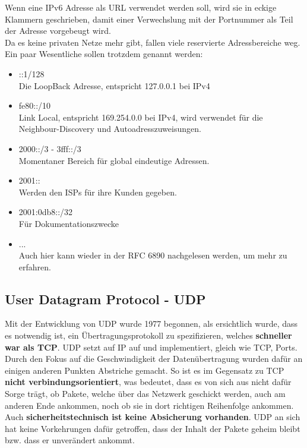 \documentclass[12pt,a4paper]{report}
\begin{document}
Wenn eine IPv6 Adresse als URL verwendet werden soll, wird sie in eckige Klammern geschrieben, damit einer Verwechslung mit der Portnummer als Teil der Adresse vorgebeugt wird.\\

Da es keine privaten Netze mehr gibt, fallen viele reservierte Adressbereiche weg. Ein paar Wesentliche sollen trotzdem genannt werden:
\begin{itemize}
\item ::1/128\\
Die LoopBack Adresse, entspricht 127.0.0.1 bei IPv4
\item fe80::/10\\
Link Local, entspricht 169.254.0.0 bei IPv4, wird verwendet für die Neighbour-Discovery und Autoadresszuweisungen.
\item 2000::/3 - 3fff::/3\\
Momentaner Bereich für global eindeutige Adressen.
\item 2001::\\
Werden den ISPs für ihre Kunden gegeben.
\item 2001:0db8::/32\\
Für Dokumentationszwecke
\item ...\\
Auch hier kann wieder in der RFC 6890 nachgelesen werden, um mehr zu erfahren.
\end{itemize}
\subsection{User Datagram Protocol - UDP}
Mit der Entwicklung von UDP wurde 1977 begonnen, als ersichtlich wurde, dass es notwendig ist, ein Übertragungsprotokoll zu spezifizieren, welches \textbf{schneller war als TCP}. UDP setzt auf IP auf und implementiert, gleich wie TCP, Ports.\\

Durch den Fokus auf die Geschwindigkeit der Datenübertragung wurden dafür an einigen anderen Punkten Abstriche gemacht. So ist es im Gegensatz zu TCP \textbf{nicht verbindungsorientiert}, was bedeutet, dass es von sich aus nicht dafür Sorge trägt, ob Pakete, welche über das Netzwerk geschickt werden, auch am anderen Ende ankommen, noch ob sie in dort richtigen Reihenfolge ankommen.\\
Auch \textbf{sicherheitstechnisch ist keine Absicherung vorhanden}. UDP an sich hat keine Vorkehrungen dafür getroffen, dass der Inhalt der Pakete geheim bleibt bzw. dass er unverändert ankommt.\\
\end{document}
